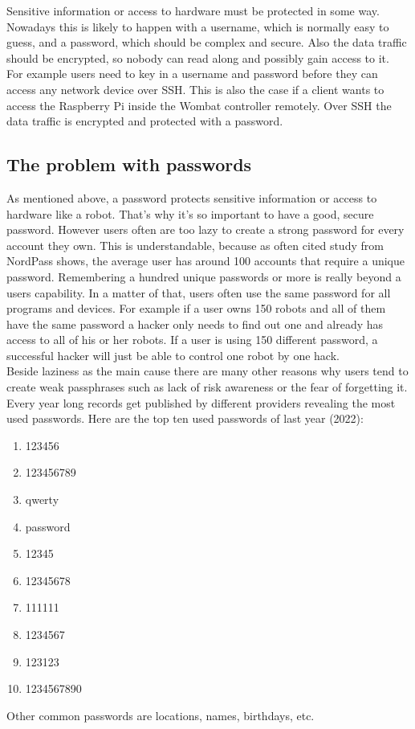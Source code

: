 \documentclass[conference]{IEEEtran}
\begin{document}
Sensitive information or access to hardware must be protected in some way. Nowadays this is likely to happen with a username, which is normally easy to guess, and a password, which should be complex and secure. Also the data traffic should be encrypted, so nobody can read along and possibly gain access to it.\\
For example users need to key in a username and password before they can access any network device over SSH. This is also the case if a client wants to access the Raspberry Pi inside the Wombat controller remotely. Over SSH the data traffic is encrypted and protected with a password.


\subsection{The problem with passwords}

As mentioned above, a password protects sensitive information or access to hardware like a robot. That's why it's so important to have a good, secure password. However users often are too lazy to create a strong password for every account they own. This is understandable, because as often cited study from NordPass shows, the average user has around 100 accounts that require a unique password. Remembering a hundred unique passwords or more is really beyond a users capability. In a matter of that, users often use the same password for all programs and devices. For example if a user owns 150 robots and all of them have the same password a hacker only needs to find out one and already has access to all of his or her robots. If a user is using 150 different password, a successful hacker will just be able to control one robot by one hack.\cite{b1} \cite{b2}\\
Beside laziness as the main cause there are many other reasons why users tend to create weak passphrases such as lack of risk awareness or the fear of forgetting it.\\
Every year long records get published by different providers revealing the most used passwords. Here are the top ten used passwords of last year (2022): \cite{b3}
\begin{enumerate}
    \item 123456
    \item 123456789
    \item qwerty
    \item password
    \item 12345
    \item 12345678
    \item 111111
    \item 1234567
    \item 123123
    \item 1234567890
\end{enumerate}
Other common passwords are locations, names, birthdays, etc.
\end{document}
